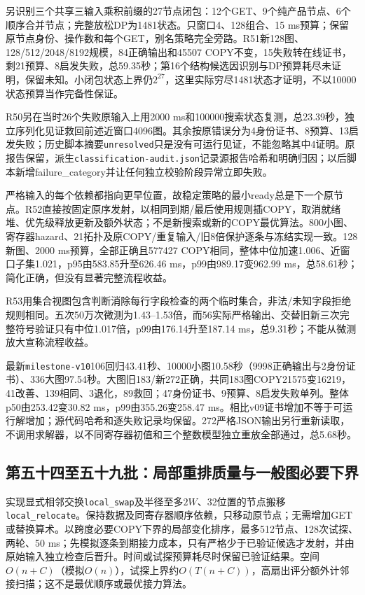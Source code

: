 \documentclass[UTF8,11pt,fontset=fandol]{ctexart}
\begin{document}
另识别三个共享三输入乘积前缀的27节点闭包：12个GET、9个纯产品节点、6个顺序合并节点；完整放松DP为1481状态。只窗口4、128组合、15 ms预算；保留原节点身份、操作数和每个GET，别名策略完全旁路。R51新128图、128/512/2048/8192规模，84正确输出和45507 COPY不变，15失败转在线证书，剩21预算、8启发失败，总59.35秒；第16个结构候选因识别与DP预算耗尽未证明，保留未知。小闭包状态上界仍$2^{27}$，这里实际穷尽1481状态才证明，不以10000状态预算当作完备性保证。

R50另在当时26个失败原输入上用2000 ms和100000搜索状态复测，总23.39秒，独立序列化见证救回前述近窗口4096图。其余按原错误分为4身份证书、8预算、13启发失败；历史脚本摘要\texttt{unresolved}只是没有可运行见证，不能忽略其中4证明。原报告保留，派生\texttt{classification-audit.json}记录源报告哈希和明确归因；以后脚本新增failure\_category并让任何独立校验阶段异常立即失败。

严格输入的每个依赖都指向更早位置，故稳定策略的最小ready总是下一个原节点。R52直接按固定原序发射，以相同到期/最后使用规则插COPY，取消就绪堆、优先级释放更新及额外状态；不是新搜索或新的COPY最优算法。800小图、寄存器hazard、21拓扑及原COPY/重复输入/旧8倍保护逐条与冻结实现一致。128新图、2000 ms预算，全部正确且577427 COPY相同，整体中位加速1.006、近窗口子集1.021，p95由583.85升至626.46 ms，p99由989.17变962.99 ms，总58.61秒；简化正确，但没有显著完整流程收益。

R53用集合视图包含判断消除每行字段检查的两个临时集合，非法/未知字段拒绝规则相同。五次50万次微测为1.43--1.53倍，而56实际严格输出、交替旧新三次完整符号验证只有中位1.017倍，p99由176.14升至187.14 ms，总9.31秒；不能从微测放大宣称流程收益。

最新\texttt{milestone-v10}106回归43.41秒、10000小图10.58秒（9998正确输出与2身份证书）、336大图97.54秒。大图旧183/新272正确，共同183图COPY21575变16219，41改善、139相同、3退化，89救回；47身份证书、9预算、8启发失败单列。整体p50由253.42变30.82 ms，p99由355.26变258.47 ms。相比v09证书增加不等于可运行解增加；源代码哈希和逐失败记录均保留。272严格JSON输出另行重新读取，不调用求解器，以不同寄存器初值和三个整数模型独立重放全部通过，总5.68秒。

\subsection{第五十四至五十九批：局部重排质量与一般图必要下界}
实现显式相邻交换\texttt{local\_swap}及半径至多$2W$、32位置的节点搬移\texttt{local\_relocate}。保持数据及同寄存器顺序依赖，只移动原节点；无需增加GET或替换算术。以跨度必要COPY下界的局部变化排序，最多512节点、128次试探、两轮、50 ms；先模拟逐条到期接力成本，只有严格少于已验证候选才发射，并由原始输入独立检查后晋升。时间或试探预算耗尽时保留已验证结果。空间$O(n+C)$（模拟$O(n)$），试探上界约$O(T(n+C))$，高扇出评分额外计邻接扫描；这不是最优顺序或最优接力算法。
\end{document}
